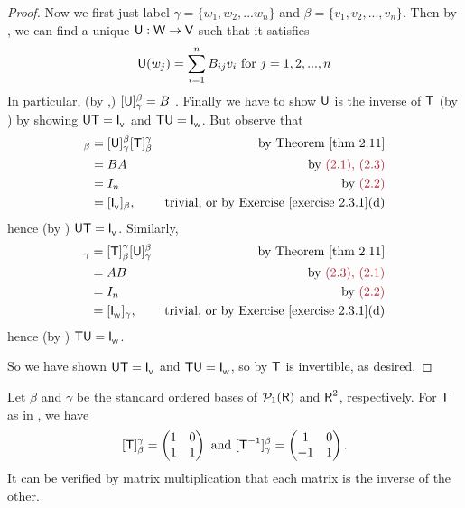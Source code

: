 \begin{proof}
Now we first just label \(\gamma = \{ w_1, w_2, ... w_n \}\) and \(\beta = \{ v_1, v_2, ..., v_n \}\).
Then by , we can find a unique \LTRAN{} \(\textsf{U} : \textsf{W} \to \textsf{V}\) such that it satisfies
\[
    \textsf{U}(w_j) = \sum_{i = 1}^n B_{ij} v_{i} \text{ for \(j = 1, 2, ..., n\)}
\]
In particular, (by ,) \([\textsf{U}]_{\gamma}^{\beta} = B\) .
Finally we have to show \(\textsf{U}\) is the inverse of \(\textsf{T}\) (by ) by showing \(\textsf{U}\textsf{T} = \textsf{I}_{_{\textsf{V}}}\) and \(\textsf{T}\textsf{U} = \textsf{I}_{_{\textsf{W}}}\).
But observe that
\begin{align*}
    [\U\T]_{\beta} & = [\U]_{\gamma}^{\beta} [\T]_{\beta}^{\gamma} & \text{by \THM{2.11}} \\
                   & = BA & \text{by \MAROON{(2.1), (2.3)}} \\
                   & = I_n & \text{by \MAROON{(2.2)}} \\
                   & = [\ITRANV]_{\beta}, & \text{trivial, or by \EXEC{2.3.1}(d)}
\end{align*}
hence (by ) \(\textsf{U}\textsf{T} = \textsf{I}_{_{\textsf{V}}}\).
Similarly,
\begin{align*}
    [\T\U]_{\gamma} & = [\T]_{\beta}^{\gamma} [\U]_{\gamma}^{\beta} & \text{by \THM{2.11}} \\
                   & = AB & \text{by \MAROON{(2.3), (2.1)}} \\
                   & = I_n & \text{by \MAROON{(2.2)}} \\
                   & = [\ITRANW]_{\gamma}, & \text{trivial, or by \EXEC{2.3.1}(d)}
\end{align*}
hence (by ) \(\textsf{T}\textsf{U} = \textsf{I}_{_{\textsf{W}}}\).

So we have shown \(\textsf{U}\textsf{T} = \textsf{I}_{_{\textsf{V}}}\) and \(\textsf{T}\textsf{U} = \textsf{I}_{_{\textsf{W}}}\), so by  \(\textsf{T}\) is invertible, as desired.
\end{proof}

\begin{example} \label{example 2.4.3}
Let \(\beta\) and \(\gamma\) be the standard ordered bases of \(\mathcal{P}_1(\textsf{R})\) and \(\textsf{R}^2\), respectively.
For \(\textsf{T}\) as in , we have
\[
    [\textsf{T}]_{\beta}^{\gamma} = \begin{pmatrix} 1 & 0 \\ 1 & 1 \end{pmatrix}
    \text{ and }
    [\textsf{T}^{-1}]_{\gamma}^{\beta} = \begin{pmatrix} 1 & 0 \\ -1 & 1 \end{pmatrix}.
\]
It can be verified by matrix multiplication that each matrix is the inverse of the other.
\end{example}

